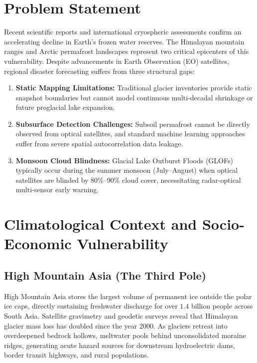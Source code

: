 \documentclass[12pt,a4paper]{report}
\begin{document}
\section{Problem Statement}
Recent scientific reports and international cryospheric assessments confirm an accelerating decline in Earth's frozen water reserves. The Himalayan mountain ranges and Arctic permafrost landscapes represent two critical epicenters of this vulnerability. Despite advancements in Earth Observation (EO) satellites, regional disaster forecasting suffers from three structural gaps:
\begin{enumerate}
    \item \textbf{Static Mapping Limitations:} Traditional glacier inventories provide static snapshot boundaries but cannot model continuous multi-decadal shrinkage or future proglacial lake expansion.
    \item \textbf{Subsurface Detection Challenges:} Subsoil permafrost cannot be directly observed from optical satellites, and standard machine learning approaches suffer from severe spatial autocorrelation data leakage.
    \item \textbf{Monsoon Cloud Blindness:} Glacial Lake Outburst Floods (GLOFs) typically occur during the summer monsoon (July--August) when optical satellites are blinded by 80\%--90\% cloud cover, necessitating radar-optical multi-sensor early warning.
\end{enumerate}

\section{Climatological Context and Socio-Economic Vulnerability}
\subsection{High Mountain Asia (The Third Pole)}
High Mountain Asia stores the largest volume of permanent ice outside the polar ice caps, directly sustaining freshwater discharge for over $1.4$ billion people across South Asia. Satellite gravimetry and geodetic surveys reveal that Himalayan glacier mass loss has doubled since the year 2000. As glaciers retreat into overdeepened bedrock hollows, meltwater pools behind unconsolidated moraine ridges, generating acute hazard sources for downstream hydroelectric dams, border transit highways, and rural populations.
\end{document}

